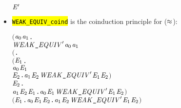 \begin{itemize}
\begin{alltt}
    \HOLSymConst{\HOLTokenWeakEQ} \ensuremath{\HOLFreeVar{E}\sp{\prime}}
\end{alltt}
\item \hl{\texttt{WEAK_EQUIV_coind}} is the coinduction principle for  ($\approx$):
\begin{alltt}
\HOLTokenTurnstile{} \ensuremath{(}\HOLSymConst{\HOLTokenForall{}}\ensuremath{\HOLBoundVar{a}\sb{\mathrm{0}}} \ensuremath{\HOLBoundVar{a}\sb{\mathrm{1}}}.
        \ensuremath{\HOLFreeVar{WEAK\HOLTokenUnderscore{}EQUIV}\sp{\prime}} \ensuremath{\HOLBoundVar{a}\sb{\mathrm{0}}} \ensuremath{\HOLBoundVar{a}\sb{\mathrm{1}}} \HOLSymConst{\HOLTokenImp{}}
        \ensuremath{(}\HOLSymConst{\HOLTokenForall{}}.
             \ensuremath{(}\HOLSymConst{\HOLTokenForall{}}\ensuremath{\HOLBoundVar{E}\sb{\mathrm{1}}}.
                  \ensuremath{\HOLBoundVar{a}\sb{\mathrm{0}}} \HOLTokenTransBegin{} \HOLTokenTransEnd \ensuremath{\HOLBoundVar{E}\sb{\mathrm{1}}} \HOLSymConst{\HOLTokenImp{}}
                  \HOLSymConst{\HOLTokenExists{}}\ensuremath{\HOLBoundVar{E}\sb{\mathrm{2}}}. \ensuremath{\HOLBoundVar{a}\sb{\mathrm{1}}} \HOLTokenWeakTransBegin{} \HOLTokenWeakTransEnd \ensuremath{\HOLBoundVar{E}\sb{\mathrm{2}}} \HOLSymConst{\HOLTokenConj{}} \ensuremath{\HOLFreeVar{WEAK\HOLTokenUnderscore{}EQUIV}\sp{\prime}} \ensuremath{\HOLBoundVar{E}\sb{\mathrm{1}}} \ensuremath{\HOLBoundVar{E}\sb{\mathrm{2}}}\ensuremath{)} \HOLSymConst{\HOLTokenConj{}}
             \HOLSymConst{\HOLTokenForall{}}\ensuremath{\HOLBoundVar{E}\sb{\mathrm{2}}}.
                 \ensuremath{\HOLBoundVar{a}\sb{\mathrm{1}}} \HOLTokenTransBegin{} \HOLTokenTransEnd \ensuremath{\HOLBoundVar{E}\sb{\mathrm{2}}} \HOLSymConst{\HOLTokenImp{}} \HOLSymConst{\HOLTokenExists{}}\ensuremath{\HOLBoundVar{E}\sb{\mathrm{1}}}. \ensuremath{\HOLBoundVar{a}\sb{\mathrm{0}}} \HOLTokenWeakTransBegin{} \HOLTokenWeakTransEnd \ensuremath{\HOLBoundVar{E}\sb{\mathrm{1}}} \HOLSymConst{\HOLTokenConj{}} \ensuremath{\HOLFreeVar{WEAK\HOLTokenUnderscore{}EQUIV}\sp{\prime}} \ensuremath{\HOLBoundVar{E}\sb{\mathrm{1}}} \ensuremath{\HOLBoundVar{E}\sb{\mathrm{2}}}\ensuremath{)} \HOLSymConst{\HOLTokenConj{}}
        \ensuremath{(}\HOLSymConst{\HOLTokenForall{}}\ensuremath{\HOLBoundVar{E}\sb{\mathrm{1}}}. \ensuremath{\HOLBoundVar{a}\sb{\mathrm{0}}} \HOLTokenTransBegin\HOLSymConst{\ensuremath{\tau}}\HOLTokenTransEnd \ensuremath{\HOLBoundVar{E}\sb{\mathrm{1}}} \HOLSymConst{\HOLTokenImp{}} \HOLSymConst{\HOLTokenExists{}}\ensuremath{\HOLBoundVar{E}\sb{\mathrm{2}}}. \ensuremath{\HOLBoundVar{a}\sb{\mathrm{1}}} \HOLSymConst{\HOLTokenEPS} \ensuremath{\HOLBoundVar{E}\sb{\mathrm{2}}} \HOLSymConst{\HOLTokenConj{}} \ensuremath{\HOLFreeVar{WEAK\HOLTokenUnderscore{}EQUIV}\sp{\prime}} \ensuremath{\HOLBoundVar{E}\sb{\mathrm{1}}} \ensuremath{\HOLBoundVar{E}\sb{\mathrm{2}}}\ensuremath{)} \HOLSymConst{\HOLTokenConj{}}

\end{alltt}
\end{itemize}
